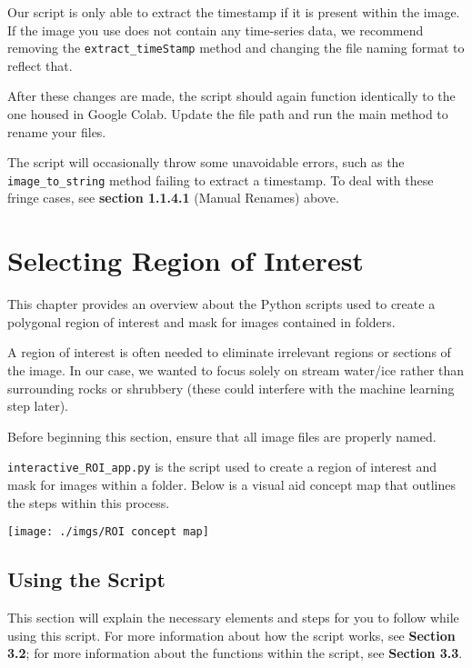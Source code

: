 \documentclass[
]{article}
\begin{document}
Our script is only able to extract the timestamp if it is present within the image.
If the image you use does not contain any time-series data, we recommend removing the \texttt{extract\_timeStamp} method and changing the file naming format to reflect that.

After these changes are made, the script should again function identically to
the one housed in Google Colab. Update the file path and run the main method to
rename your files.

The script will occasionally throw some unavoidable errors, such as the \texttt{image\_to\_string} method failing to extract a timestamp. To deal
with these fringe cases, see \textbf{section 1.1.4.1} (Manual Renames) above.

\hypertarget{selecting-region-of-interest}{%
\section{Selecting Region of Interest}\label{selecting-region-of-interest}}

This chapter provides an overview about the Python scripts used to create a polygonal region of interest and mask for images contained in folders.

A region of interest is often needed to eliminate irrelevant regions or sections of the image. In our case, we wanted to focus solely on stream water/ice rather than surrounding rocks or shrubbery (these could interfere with the machine learning step later).

Before beginning this section, ensure that all image files are properly named.

\texttt{interactive\_ROI\_app.py} is the script used to create a region of interest and mask for images within a folder. Below is a visual aid concept map that outlines the steps within this process.

\texttt{[image: ./imgs/ROI concept map]}

\hypertarget{using-the-script}{%
\subsection{Using the Script}\label{using-the-script}}

This section will explain the necessary elements and steps for you to follow while
using this script. For more information about how the script works, see \textbf{Section 3.2}; for more information about the functions within the script, see \textbf{Section 3.3}.
\end{document}
